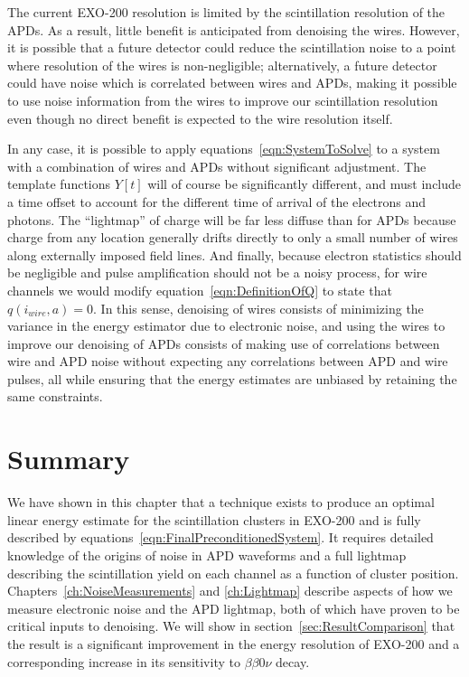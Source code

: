 The current EXO-200 resolution is limited by the scintillation resolution of the APDs.  As a result, little benefit is anticipated from denoising the wires.  However, it is possible that a future detector could reduce the scintillation noise to a point where resolution of the wires is non-negligible; alternatively, a future detector could have noise which is correlated between wires and APDs, making it possible to use noise information from the wires to improve our scintillation resolution even though no direct benefit is expected to the wire resolution itself.

In any case, it is possible to apply equations~\ref{eqn:SystemToSolve} to a system with a combination of wires and APDs without significant adjustment.  The template functions $Y[t]$ will of course be significantly different, and must include a time offset to account for the different time of arrival of the electrons and photons.  The ``lightmap'' of charge will be far less diffuse than for APDs because charge from any location generally drifts directly to only a small number of wires along externally imposed field lines.  And finally, because electron statistics should be negligible and pulse amplification should not be a noisy process, for wire channels we would modify equation~\ref{eqn:DefinitionOfQ} to state that $q(i_{wire}, a) = 0$.  In this sense, denoising of wires consists of minimizing the variance in the energy estimator due to electronic noise, and using the wires to improve our denoising of APDs consists of making use of correlations between wire and APD noise without expecting any correlations between APD and wire pulses, all while ensuring that the energy estimates are unbiased by retaining the same constraints.

\section{Summary}

We have shown in this chapter that a technique exists to produce an optimal linear energy estimate for the scintillation clusters in EXO-200 and is fully described by equations~\ref{eqn:FinalPreconditionedSystem}.  It requires detailed knowledge of the origins of noise in APD waveforms and a full lightmap describing the scintillation yield on each channel as a function of cluster position.  Chapters~\ref{ch:NoiseMeasurements} and \ref{ch:Lightmap} describe aspects of how we measure electronic noise and the APD lightmap, both of which have proven to be critical inputs to denoising.  We will show in section~\ref{sec:ResultComparison} that the result is a significant improvement in the energy resolution of EXO-200 and a corresponding increase in its sensitivity to $\beta\beta 0\nu$ decay.
